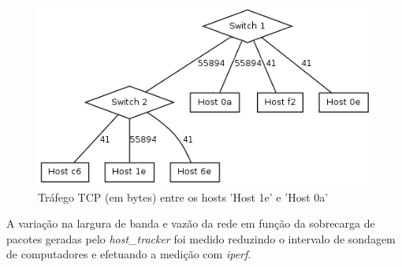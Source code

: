 \begin{figure}[h!]
    \centering
    \includegraphics[scale=0.8]{img/graph-iperf}
    \caption{Tráfego TCP (em bytes) entre os hosts ’Host 1e’ e ’Host 0a’}
    \label{fig:iperf}
\end{figure}

A variação na largura de banda e vazão da rede em função da sobrecarga de 
pacotes geradas pelo \emph{host\_tracker} foi medido reduzindo o intervalo
de sondagem de computadores e efetuando a medição com \emph{iperf}. 

